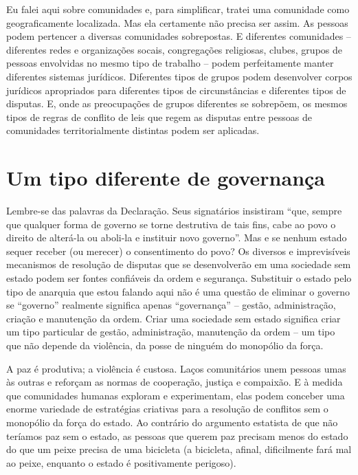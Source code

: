 Eu falei aqui sobre comunidades e, para simplificar, tratei uma comunidade como geograficamente localizada. Mas ela certamente não precisa ser assim. As pessoas podem pertencer a diversas comunidades sobrepostas. E diferentes comunidades -- diferentes redes e organizações socais, congregações religiosas, clubes, grupos de pessoas envolvidas no mesmo tipo de trabalho -- podem perfeitamente manter diferentes sistemas jurídicos. Diferentes tipos de grupos podem desenvolver corpos jurídicos apropriados para diferentes tipos de circunstâncias e diferentes tipos de disputas. E, onde as preocupações de grupos diferentes se sobrepõem, os mesmos tipos de regras de conflito de leis que regem as disputas entre pessoas de comunidades territorialmente distintas podem ser aplicadas.

\section{Um tipo diferente de governança}

Lembre-se das palavras da Declaração. Seus signatários insistiram ``que, sempre que qualquer forma de governo se torne destrutiva de tais fins, cabe ao povo o direito de alterá-la ou aboli-la e instituir novo governo''. Mas e se nenhum estado sequer receber (ou merecer) o consentimento do povo? Os diversos e imprevisíveis mecanismos de resolução de disputas que se desenvolverão em uma sociedade sem estado podem ser fontes confiáveis da ordem e segurança. Substituir o estado pelo tipo de anarquia que estou falando aqui não é uma questão de eliminar o governo se ``governo'' realmente significa apenas ``governança'' -- gestão, administração, criação e manutenção da ordem. Criar uma sociedade sem estado significa criar um tipo particular de gestão, administração, manutenção da ordem -- um tipo que não depende da violência, da posse de ninguém do monopólio da força.

A paz é produtiva; a violência é custosa. Laços comunitários unem pessoas umas às outras e reforçam as normas de cooperação, justiça e compaixão. E à medida que comunidades humanas exploram e experimentam, elas podem conceber uma enorme variedade de estratégias criativas para a resolução de conflitos sem o monopólio da força do estado. Ao contrário do argumento estatista de que não teríamos paz sem o estado, as pessoas que querem paz precisam menos do estado do que um peixe precisa de uma bicicleta (a bicicleta, afinal, dificilmente fará mal ao peixe, enquanto o estado é positivamente perigoso).

